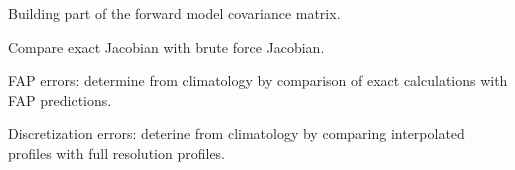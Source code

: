     \stopsubsection

    \startsubsection[title={Characterizing Errors},reference={ch:rtm_errors}]

        Building part of the forward model covariance matrix.

        Compare exact Jacobian with brute force Jacobian.

        FAP errors: determine from climatology by comparison of exact
        calculations with FAP predictions.

        Discretization errors: deterine from climatology by comparing
        interpolated profiles with full resolution profiles.

    \stopsubsection

\stopsection

